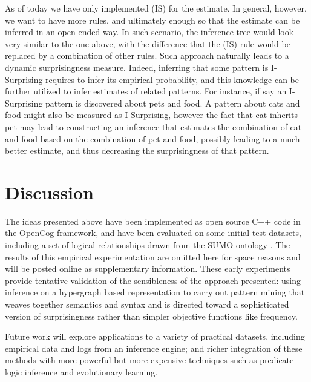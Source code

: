 \documentclass[runningheads]{llncs}
\begin{document}
As of today we have only implemented (IS) for the estimate. In
general, however, we want to have more rules, and ultimately enough so
that the estimate can be inferred in an open-ended way. In such
scenario, the inference tree would look very similar to the one above,
with the difference that the (IS) rule would be replaced by a
combination of other rules. Such approach naturally leads to a dynamic
surprisingness measure. Indeed, inferring that some pattern is
I-Surprising requires to infer its empirical probability, and this
knowledge can be further utilized to infer estimates of related
patterns. For instance, if say an I-Surprising pattern is discovered
about pets and food. A pattern about cats and food might also be
measured as I-Surprising, however the fact that cat inherits pet may
lead to constructing an inference that estimates the combination of
cat and food based on the combination of pet and food, possibly
leading to a much better estimate, and thus decreasing the
surprisingness of that pattern.

\section{Discussion}

The ideas presented above have been implemented as open source C++
code in the OpenCog framework, and have been evaluated on some initial
test datasets, including a set of logical relationships drawn from the
SUMO ontology \cite{Pease2011}.  The results of this empirical
experimentation are omitted here for space reasons and will be posted
online as supplementary information.  These early experiments provide
tentative validation of the sensibleness of the approach presented:
using inference on a hypergraph based representation to carry out
pattern mining that weaves together semantics and syntax and is
directed toward a sophisticated version of surprisingness rather than
simpler objective functions like frequency.

Future work will explore applications
to a variety of practical datasets, including empirical data and logs from an inference engine; and
richer integration of these methods with more powerful but more expensive techniques such as
predicate logic inference and evolutionary learning.


\end{document}
